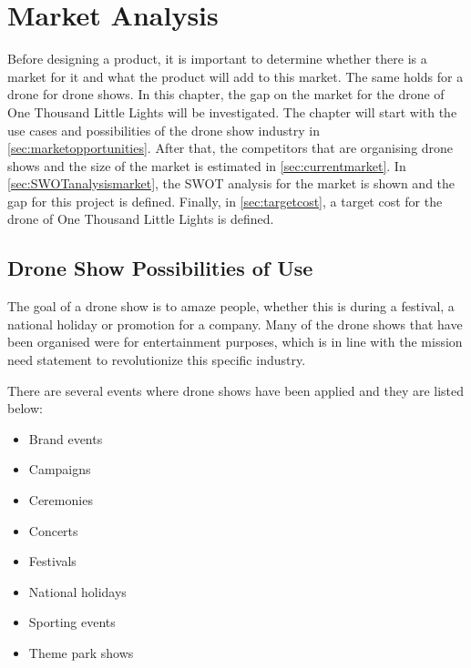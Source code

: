 \chapter{Market Analysis}
\label{ch:Marketanalysis}



Before designing a product, it is important to determine whether there is a market for it and what the product will add to this market. The same holds for a drone for drone shows. In this chapter, the gap on the market for the drone of One Thousand Little Lights will be investigated.
The chapter will start with the use cases and possibilities of the drone show industry in \autoref{sec:marketopportunities}. After that, the competitors that are organising drone shows and the size of the market is estimated in \autoref{sec:currentmarket}. In \autoref{sec:SWOTanalysismarket}, the SWOT analysis for the market is shown and the gap for this project is defined. Finally, in \autoref{sec:targetcost}, a target cost for the drone of One Thousand Little Lights is defined.

\section{Drone Show Possibilities of Use}\label{sec:marketopportunities}

The goal of a drone show is to amaze people, whether this is during a festival, a national holiday or promotion for a company. Many of the drone shows that have been organised were for entertainment purposes, which is in line with the mission need statement to revolutionize this specific industry.

There are several events where drone shows have been applied and they are listed below:
\begin{multicols}{2}
\begin{itemize}[noitemsep,nolistsep]
    \item Brand events
    \item Campaigns
    \item Ceremonies
    \item Concerts
    \item Festivals
    \item National holidays
    \item Sporting events
    \item Theme park shows
\end{itemize}
\end{multicols}

